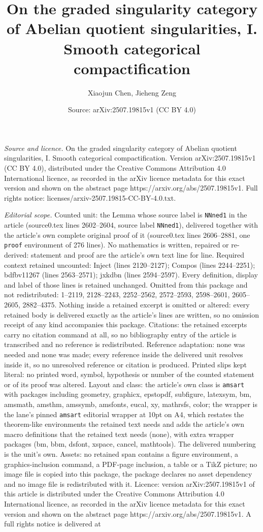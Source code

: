 \documentclass[10pt,a4paper]{amsart}
\title[On the graded singularity category of Abelian quotient singu]{On the graded singularity category of Abelian quotient singularities, I. Smooth categorical compactification}
\author{Xiaojun Chen, Jieheng Zeng}
\date{Source: arXiv:2507.19815v1 (CC BY 4.0)}
\begin{document}
\maketitle

\noindent\emph{Source and licence.} On the graded singularity category of Abelian quotient singularities, I. Smooth categorical compactification. Version arXiv:2507.19815v1 (CC BY 4.0), distributed under the Creative Commons Attribution 4.0 International licence, as recorded in the arXiv licence metadata for this exact version and shown on the abstract page https://arxiv.org/abs/2507.19815v1. Full rights notice: licenses/arxiv-2507.19815-CC-BY-4.0.txt.\par\smallskip

\noindent\textit{Editorial scope.} Counted unit: the Lemma whose source label is \texttt{NNned1} in the article (source0.tex lines 2602--2604, source label \texttt{NNned1}), delivered together with the article's own complete original proof of it (source0.tex lines 2606--2881, one \texttt{proof} environment of 276 lines). No mathematics is written, repaired or re-derived: statement and proof are the article's own text line for line. Required context retained uncounted: Inject (lines 2120--2127); Compos (lines 2244--2251); bdfbv11267 (lines 2563--2571); jxkdbn (lines 2594--2597). Every definition, display and label of those lines is retained unchanged. Omitted from this package and not redistributed: 1--2119, 2128--2243, 2252--2562, 2572--2593, 2598--2601, 2605--2605, 2882--4375. Nothing inside a retained excerpt is omitted or altered: every retained body is delivered exactly as the article's lines are written, so no omission receipt of any kind accompanies this package. Citations: the retained excerpts carry no citation command at all, so no bibliography entry of the article is transcribed and no reference is redistributed. Reference adaptation: none was needed and none was made; every reference inside the delivered unit resolves inside it, so no unresolved reference or citation is produced. Printed slips kept literal: no printed word, symbol, hypothesis or number of the counted statement or of its proof was altered. Layout and class: the article's own class is \texttt{amsart} with packages including geometry, graphicx, epstopdf, subfigure, latexsym, bm, amsmath, amsthm, amssymb, amsfonts, eucal, xy, mathrsfs, color; the wrapper is the lane's pinned \texttt{amsart} editorial wrapper at 10pt on A4, which restates the theorem-like environments the retained text needs and adds the article's own macro definitions that the retained text needs (none), with extra wrapper packages (bm, bbm, dsfont, xspace, cancel, mathtools). The delivered numbering is the unit's own. Assets: no retained span contains a figure environment, a graphics-inclusion command, a PDF-page inclusion, a table or a TikZ picture; no image file is copied into this package, the package declares no asset dependency and no image file is redistributed with it. Licence: version arXiv:2507.19815v1 of this article is distributed under the Creative Commons Attribution 4.0 International licence, as recorded in the arXiv licence metadata for this exact version and shown on the abstract page https://arxiv.org/abs/2507.19815v1. A full rights notice is delivered at 
\end{document}
